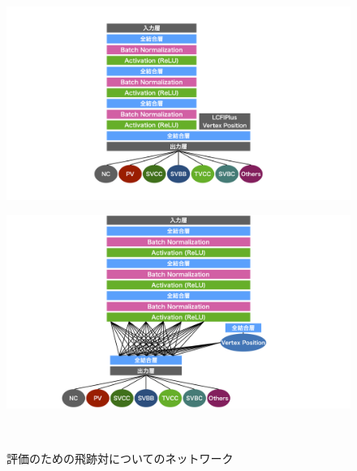 \begin{figure}[htbp]
 \centering
  \begin{minipage}{1.0\textwidth}
  \centering
   \begin{minipage}{1.0\textwidth}
    \centering
    \includegraphics[trim = 200 70 200 0, width=1.0\textwidth, clip]{Figure/3Networks/3-3-3-1PairNetworkA.png}
    \label{3-3-3-1PairNetworkA}
   \end{minipage}
   
   \begin{minipage}{1.0\textwidth}
   \centering
    \includegraphics[trim = 200 0 200 0, width=1.0\textwidth, clip]{Figure/3Networks/3-3-3-1PairNetworkB.png}
    \label{3-3-3-1PairNetworkB}
   \end{minipage}
  \end{minipage}  
  \caption{評価のための飛跡対についてのネットワーク}
  \label{3-3-3-1PairNetworks}
\end{figure}

